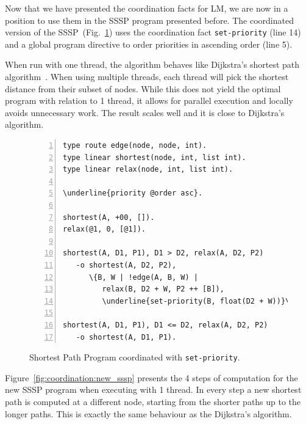 Now that we have presented the coordination facts for LM, we are now in a
position to use them in the SSSP program presented before.  The coordinated
version of the SSSP~(Fig.~\ref{code:shortest_path_program_coord}) uses the
coordination fact \texttt{set-priority} (line 14) and a global program directive
to order priorities in ascending order (line 5).

When run with one thread, the algorithm behaves like Dijkstra's shortest path
algorithm~\cite{Dijkstra}. When using multiple threads, each thread will pick
the shortest distance from their subset of nodes.  While this does not yield the
optimal program with relation to 1 thread, it allows for parallel execution and
locally avoids unnecessary work. The result scales well and it is close to
Dijkstra's algorithm.

\begin{figure}[ht]
\begin{Verbatim}[numbers=left,commandchars=\\\{\},fontsize=\scriptsize]
type route edge(node, node, int).
type linear shortest(node, int, list int).
type linear relax(node, int, list int).

\underline{priority @order asc}.

shortest(A, +00, []).
relax(@1, 0, [@1]).

shortest(A, D1, P1), D1 > D2, relax(A, D2, P2)
   -o shortest(A, D2, P2),
      \{B, W | !edge(A, B, W) |
         relax(B, D2 + W, P2 ++ [B]),
         \underline{set-priority(B, float(D2 + W))}\}.

shortest(A, D1, P1), D1 <= D2, relax(A, D2, P2)
   -o shortest(A, D1, P1).
\end{Verbatim}
   \caption{Shortest Path Program coordinated with \texttt{set-priority}.}
   \label{code:shortest_path_program_coord}
\end{figure}

Figure~\ref{fig:coordination:new_sssp} presents the 4 steps of computation for
the new SSSP program when executing with 1 thread. In every step a new shortest
path is computed at a different node, starting from the shorter paths up to
the longer paths. This is exactly the same behaviour as the Dijkstra's
algorithm.

